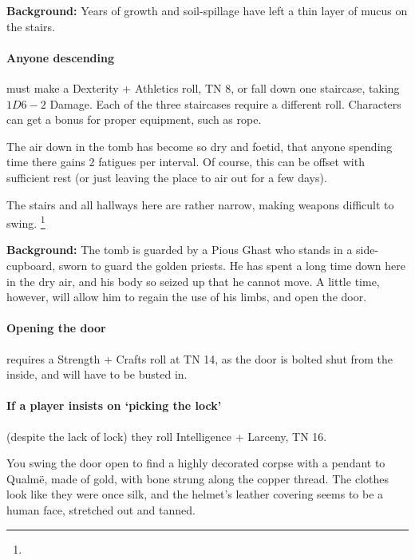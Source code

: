 \begin{multicols}{2}
\textbf{Background:}
Years of growth and soil-spillage have left a thin layer of mucus on the stairs.

\paragraph{Anyone descending}
must make a Dexterity + Athletics roll, TN 8, or fall down one staircase, taking $1D6-2$ Damage.
Each of the three staircases require a different roll.
Characters can get a bonus for proper equipment, such as rope.

The air down in the tomb has become so dry and foetid, that anyone spending time there gains 2 \glspl{fatigue} per \gls{interval}.
Of course, this can be offset with sufficient rest (or just leaving the place to air out for a few days).

The stairs and all hallways here are rather narrow, making weapons difficult to swing.%
\footnote{%
  \iftoggle{core}%
  {\nameref{enclosedcombat}.}%
  {See the Core rules on Enclosed Spaces.}%
}


\textbf{Background:}
The tomb is guarded by a Pious Ghast who stands in a side-cupboard, sworn to guard the golden priests.
He has spent a long time down here in the dry air, and his body so seized up that he cannot move.
A little time, however, will allow him to regain the use of his limbs, and open the door.

\paragraph{Opening the door}
requires a Strength + Crafts roll at TN 14, as the door is bolted shut from the inside, and will have to be busted in.

\paragraph{If a player insists on `picking the lock'}
(despite the lack of lock) they roll Intelligence + Larceny, TN 16.

\begin{boxtext}

  You swing the door open to find a highly decorated corpse with a pendant to Qualm\"e, made of gold, with bone strung along the copper thread.
  The clothes look like they were once silk, and the helmet's leather covering seems to be a human face, stretched out and tanned.


\end{boxtext}
\end{multicols}
